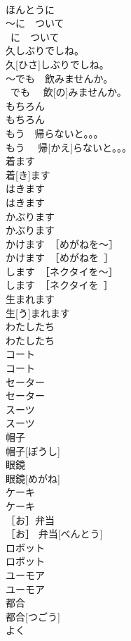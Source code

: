 \documentclass[8pt]{extreport}
\begin{document}
\begin{CJK}{UTF8}{min}
\\	ほんとうに	
\\	～に　ついて	
\\	~に　ついて	
\\	久しぶりでしね。	
\\	久[ひさ]しぶりでしね。	
\\	～でも　飲みませんか。	
\\	~でも　 飲[の]みませんか。	
\\	もちろん	
\\	もちろん	
\\	もう　帰らないと。。。	
\\	もう　 帰[かえ]らないと。。。	
\\	着ます	
\\	着[き]ます	
\\	はきます	
\\	はきます	
\\	かぶります	
\\	かぶります	
\\	かけます　［めがねを～］	
\\	かけます　［めがねを~］	
\\	します　［ネクタイを～］	
\\	します　［ネクタイを~］	
\\	生まれます	
\\	生[う]まれます	
\\	わたしたち	
\\	わたしたち	
\\	コート	
\\	コート	
\\	セーター	
\\	セーター	
\\	スーツ	
\\	スーツ	
\\	帽子	
\\	帽子[ぼうし]	
\\	眼鏡	
\\	眼鏡[めがね]	
\\	ケーキ	
\\	ケーキ	
\\	［お］弁当	
\\	［お］ 弁当[べんとう]	
\\	ロボット	
\\	ロボット	
\\	ユーモア	
\\	ユーモア	
\\	都合	
\\	都合[つごう]	
\\	よく	

\end{CJK}
\end{document}

